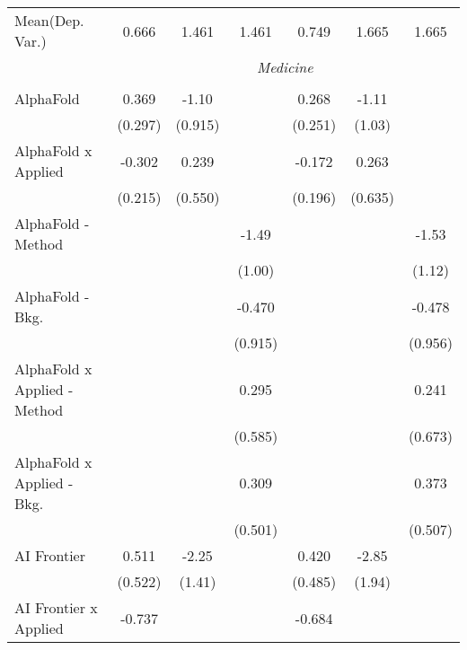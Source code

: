 \begin{tabular}{lcccccc}
Mean(Dep. Var.) & 0.666 & 1.461 & 1.461 & 0.749 & 1.665 & 1.665 \\
 & \multicolumn{6}{c}{\textit{Medicine}} \\ \\
   AlphaFold                      & 0.369          & -1.10         &               & 0.268          & -1.11        &   \\   
                                  & (0.297)        & (0.915)       &               & (0.251)        & (1.03)       &   \\   
   AlphaFold x Applied            & -0.302         & 0.239         &               & -0.172         & 0.263        &   \\   
                                  & (0.215)        & (0.550)       &               & (0.196)        & (0.635)      &   \\   
   AlphaFold - Method             &                &               & -1.49         &                &              & -1.53\\   
                                  &                &               & (1.00)        &                &              & (1.12)\\   
   AlphaFold - Bkg.               &                &               & -0.470        &                &              & -0.478\\   
                                  &                &               & (0.915)       &                &              & (0.956)\\   
   AlphaFold x Applied - Method   &                &               & 0.295         &                &              & 0.241\\   
                                  &                &               & (0.585)       &                &              & (0.673)\\   
   AlphaFold x Applied - Bkg.     &                &               & 0.309         &                &              & 0.373\\   
                                  &                &               & (0.501)       &                &              & (0.507)\\   
   AI Frontier                    & 0.511          & -2.25         &               & 0.420          & -2.85        &   \\   
                                  & (0.522)        & (1.41)        &               & (0.485)        & (1.94)       &   \\   
   AI Frontier x Applied          & -0.737         &               &               & -0.684         &              &   \\   

\end{tabular}
